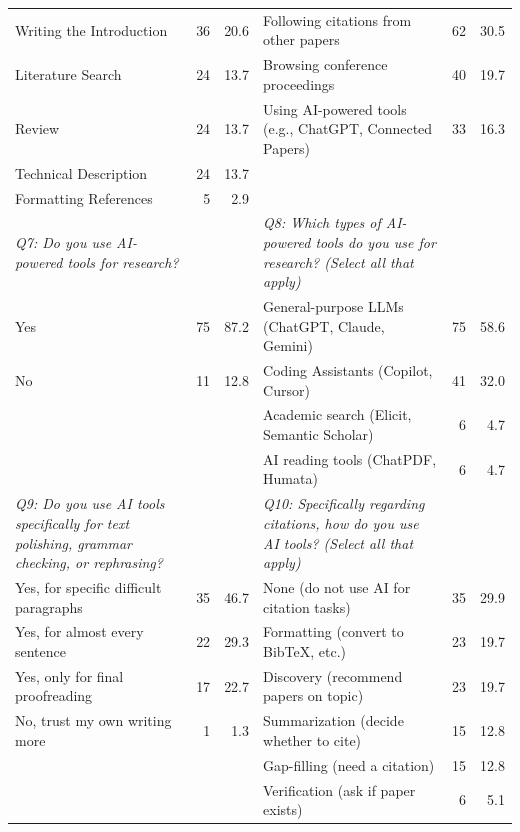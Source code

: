 \begin{table}[htbp]
\begin{threeparttable}
\begin{tabular}{p{6cm}rr|p{6cm}rr}
Writing the Introduction & 36 & 20.6 & Following citations from other papers & 62 & 30.5 \\
\rowcolor{tableRowLight}
Literature Search & 24 & 13.7 & Browsing conference proceedings & 40 & 19.7 \\
Review & 24 & 13.7 & Using AI-powered tools (e.g., ChatGPT, Connected Papers) & 33 & 16.3 \\
\rowcolor{tableRowLight}
Technical Description & 24 & 13.7 &  &  &  \\
Formatting References & 5 & 2.9 &  &  &  \\
\midrule
\textit{Q7: Do you use AI-powered tools for research?} & & & \textit{Q8: Which types of AI-powered tools do you use for research? (Select all that apply)} & & \\
\rowcolor{tableRowLight}
Yes & 75 & 87.2 & General-purpose LLMs (ChatGPT, Claude, Gemini) & 75 & 58.6 \\
No & 11 & 12.8 & Coding Assistants (Copilot, Cursor) & 41 & 32.0 \\
\rowcolor{tableRowLight}
 &  &  & Academic search (Elicit, Semantic Scholar) & 6 & 4.7 \\
 &  &  & AI reading tools (ChatPDF, Humata) & 6 & 4.7 \\
\midrule
\textit{Q9: Do you use AI tools specifically for text polishing, grammar checking, or rephrasing?} & & & \textit{Q10: Specifically regarding citations, how do you use AI tools? (Select all that apply)} & & \\
\rowcolor{tableRowLight}
Yes, for specific difficult paragraphs & 35 & 46.7 & None (do not use AI for citation tasks) & 35 & 29.9 \\
Yes, for almost every sentence & 22 & 29.3 & Formatting (convert to BibTeX, etc.) & 23 & 19.7 \\
\rowcolor{tableRowLight}
Yes, only for final proofreading & 17 & 22.7 & Discovery (recommend papers on topic) & 23 & 19.7 \\
No, trust my own writing more & 1 & 1.3 & Summarization (decide whether to cite) & 15 & 12.8 \\
\rowcolor{tableRowLight}
 &  &  & Gap-filling (need a citation) & 15 & 12.8 \\
 &  &  & Verification (ask if paper exists) & 6 & 5.1 \\
\bottomrule
    \end{tabular}
  \end{threeparttable}
\end{table}

